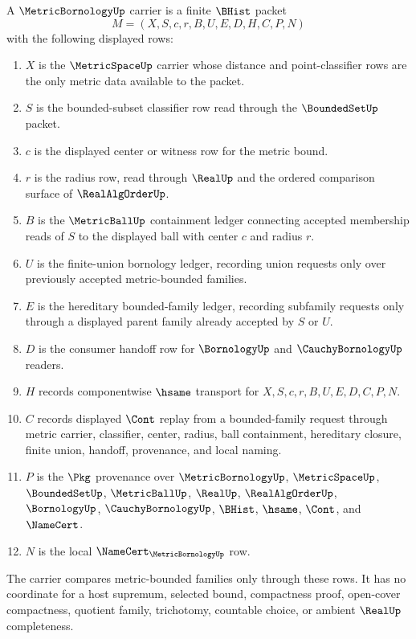\begin{definition}
\label{def:metric-bornology-carrier}
A $\MetricBornologyUp$ carrier is a finite $\BHist$ packet
$$
M=(X,S,c,r,B,U,E,D,H,C,P,N)
$$
with the following displayed rows:
\begin{enumerate}
\item $X$ is the $\MetricSpaceUp$ carrier whose distance and point-classifier rows are the only metric data available to the packet.
\item $S$ is the bounded-subset classifier row read through the $\BoundedSetUp$ packet.
\item $c$ is the displayed center or witness row for the metric bound.
\item $r$ is the radius row, read through $\RealUp$ and the ordered comparison surface of $\RealAlgOrderUp$.
\item $B$ is the $\MetricBallUp$ containment ledger connecting accepted membership reads of $S$ to the displayed ball with center $c$ and radius $r$.
\item $U$ is the finite-union bornology ledger, recording union requests only over previously accepted metric-bounded families.
\item $E$ is the hereditary bounded-family ledger, recording subfamily requests only through a displayed parent family already accepted by $S$ or $U$.
\item $D$ is the consumer handoff row for $\BornologyUp$ and $\CauchyBornologyUp$ readers.
\item $H$ records componentwise $\hsame$ transport for $X,S,c,r,B,U,E,D,C,P,N$.
\item $C$ records displayed $\Cont$ replay from a bounded-family request through metric carrier, classifier, center, radius, ball containment, hereditary closure, finite union, handoff, provenance, and local naming.
\item $P$ is the $\Pkg$ provenance over $\MetricBornologyUp$, $\MetricSpaceUp$, $\BoundedSetUp$, $\MetricBallUp$, $\RealUp$, $\RealAlgOrderUp$, $\BornologyUp$, $\CauchyBornologyUp$, $\BHist$, $\hsame$, $\Cont$, and $\NameCert$.
\item $N$ is the local $\NameCert_{\MetricBornologyUp}$ row.
\end{enumerate}
The carrier compares metric-bounded families only through these rows. It has no coordinate for a host supremum, selected bound, compactness proof, open-cover compactness, quotient family, trichotomy, countable choice, or ambient $\RealUp$ completeness.
\end{definition}

